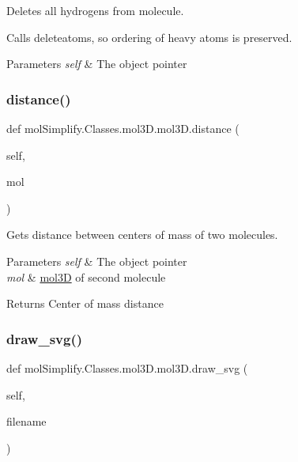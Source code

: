 Deletes all hydrogens from molecule. 

Calls deleteatoms, so ordering of heavy atoms is preserved. 
\begin{DoxyParams}{Parameters}
{\em self} & The object pointer \\
\hline
\end{DoxyParams}
\mbox{\label{classmolSimplify_1_1Classes_1_1mol3D_1_1mol3D_a7f5c446c9d071037c5500408ab57a8f6}} 
\subsubsection{\texorpdfstring{distance()}{distance()}}
{\footnotesize\ttfamily def mol\+Simplify.\+Classes.\+mol3\+D.\+mol3\+D.\+distance (\begin{DoxyParamCaption}\item[{}]{self,  }\item[{}]{mol }\end{DoxyParamCaption})}



Gets distance between centers of mass of two molecules. 


\begin{DoxyParams}{Parameters}
{\em self} & The object pointer \\
\hline
{\em mol} & \hyperlink{classmolSimplify_1_1Classes_1_1mol3D_1_1mol3D}{mol3D} of second molecule \\
\hline
\end{DoxyParams}
\begin{DoxyReturn}{Returns}
Center of mass distance 
\end{DoxyReturn}
\mbox{\label{classmolSimplify_1_1Classes_1_1mol3D_1_1mol3D_afc2743674602def7c8d9457cb40a2899}} 
\subsubsection{\texorpdfstring{draw\+\_\+svg()}{draw\_svg()}}
{\footnotesize\ttfamily def mol\+Simplify.\+Classes.\+mol3\+D.\+mol3\+D.\+draw\+\_\+svg (\begin{DoxyParamCaption}\item[{}]{self,  }\item[{}]{filename }\end{DoxyParamCaption})}



